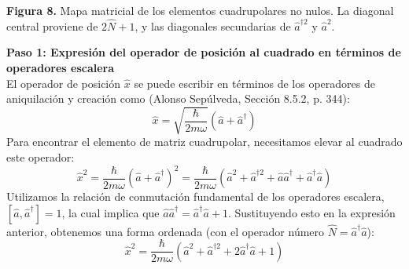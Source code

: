 \documentclass[a4paper]{article}
\begin{document}
\begin{center}

\small\textbf{Figura 8.} Mapa matricial de los elementos cuadrupolares no nulos. La diagonal central proviene de $2\hat{N}+1$, y las diagonales secundarias de $\hat{a}^{\dagger 2}$ y $\hat{a}^{2}$.
\end{center}

\vspace{0.3cm}
\noindent\textbf{Paso 1: Expresión del operador de posición al cuadrado en términos de operadores escalera} \\
El operador de posición $\hat{x}$ se puede escribir en términos de los operadores de aniquilación y creación como (Alonso Sepúlveda, Sección 8.5.2, p. 344):
$$
\hat{x} = \sqrt{\frac{\hbar}{2m\omega}} (\hat{a} + \hat{a}^\dagger)
$$
Para encontrar el elemento de matriz cuadrupolar, necesitamos elevar al cuadrado este operador:
$$
\hat{x}^2 = \frac{\hbar}{2m\omega} (\hat{a} + \hat{a}^\dagger)^2 = \frac{\hbar}{2m\omega} (\hat{a}^2 + \hat{a}^{\dagger 2} + \hat{a}\hat{a}^\dagger + \hat{a}^\dagger\hat{a})
$$
Utilizamos la relación de conmutación fundamental de los operadores escalera, $[\hat{a}, \hat{a}^\dagger] = 1$, la cual implica que $\hat{a}\hat{a}^\dagger = \hat{a}^\dagger\hat{a} + 1$. Sustituyendo esto en la expresión anterior, obtenemos una forma ordenada (con el operador número $\hat{N} = \hat{a}^\dagger\hat{a}$):
$$
\hat{x}^2 = \frac{\hbar}{2m\omega} (\hat{a}^2 + \hat{a}^{\dagger 2} + 2\hat{a}^\dagger\hat{a} + 1)
$$
\end{document}
